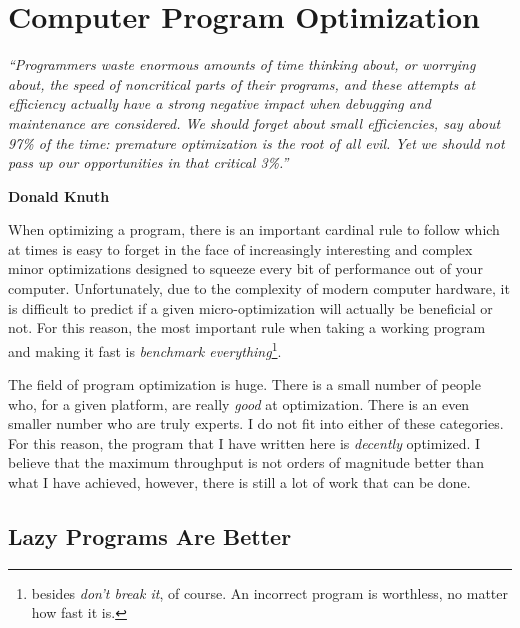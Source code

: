 \section{Computer Program Optimization} \label{app:opt}

\begin{addmargin}[16em]{0em}
	\begin{singlespace}
	{\footnotesize
	\textit{``Programmers waste enormous amounts of time thinking about, or worrying about, the speed of noncritical parts of their programs, and these attempts at efficiency actually have a strong negative impact when debugging and maintenance are considered. We should forget about small efficiencies, say about 97\% of the time: premature optimization is the root of all evil. Yet we should not pass up our opportunities in that critical 3\%.''}
		\begin{flushright}
		\textbf{Donald Knuth}
		\end{flushright}
	}
	\end{singlespace}
\end{addmargin}

When optimizing a program, there is an important cardinal rule to follow which at times
is easy to forget in the face of increasingly interesting and complex minor optimizations
designed to squeeze every bit of performance out of your computer. Unfortunately, due
to the complexity of modern computer hardware, it is
difficult to predict if a given micro-optimization will actually be beneficial or
not. For this reason, the most important rule when taking a working program and making it
fast is \textit{benchmark everything}\footnote{besides \textit{don't break it}, of course. An incorrect program is worthless, no matter
how fast it is.}.

The field of program optimization is huge. There is a small number of people who, for
a given platform, are really \textit{good} at optimization. There is an even smaller number
who are truly experts. I do not fit into either of these categories. For this reason, the program
that I have written here is \textit{decently} optimized. I believe that the maximum throughput
is not orders of magnitude better than what I have achieved, however, there is still a lot of work
that can be done.

\subsection{Lazy Programs Are Better}

